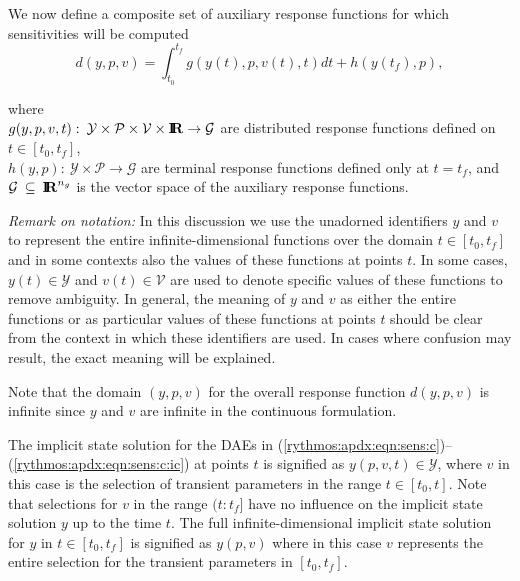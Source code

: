\documentclass[pdf,ps2pdf,11pt]{SANDreport}
\begin{document}
We now define a composite set of auxiliary response functions for which
sensitivities will be computed
%
\begin{equation}
d(y,p,v)
= \int_{t_0}^{t_f} g(y(t),p,v(t),t) dt + h(y(t_f),p),
\label{rythmos:eqn:sens:d}
\end{equation}
\begin{tabbing}
\hspace{4ex}where\hspace{1ex}\= \\
\>	$g(y,p,v,t) : \:
		\mathcal{Y} \times \mathcal{P} \times \mathcal{V} \times \mbox{\textbf{I}}\hspace{-0.6ex}\mbox{\textbf{R}}
		\rightarrow \mathcal{G}$ are distributed response functions defined on $t\in[t_0,t_f]$, \\
\>	$h(y,p) : \: \mathcal{Y} \times \mathcal{P}
		\rightarrow \mathcal{G}$ are terminal response functions defined only at $t=t_f$, and \\
\>	$\mathcal{G} \:\subseteq\:\mbox{\textbf{I}}\hspace{-0.6ex}\mbox{\textbf{R}}^{n_g}$ is the vector space of the auxiliary response functions.
\end{tabbing}

{}\textit{Remark on notation:} In this discussion we use the unadorned
identifiers $y$ and $v$ to represent the entire infinite-dimensional functions
over the domain $t\in[t_0,t_f]$ and in some contexts also the values of these
functions at points $t$.  In some cases, $y(t)\in\mathcal{Y}$ and
$v(t)\in\mathcal{V}$ are used to denote specific values of these functions to
remove ambiguity.  In general, the meaning of $y$ and $v$ as either the entire
functions or as particular values of these functions at points $t$ should be
clear from the context in which these identifiers are used.  In cases where
confusion may result, the exact meaning will be explained.

Note that the domain $(y,p,v)$ for the overall response function $d(y,p,v)$ is
infinite since $y$ and $v$ are infinite in the continuous formulation.


The implicit state solution for the DAEs in
(\ref{rythmos:apdx:eqn:sens:c})--(\ref{rythmos:apdx:eqn:sens:c:ic}) at points
$t$ is signified as $y(p,v,t)\in\mathcal{Y}$, where $v$ in this case is the
selection of transient parameters in the range $t\in[t_0,t]$.  Note that
selections for $v$ in the range $(t:t_f]$ have no influence on the implicit
state solution $y$ up to the time $t$.  The full infinite-dimensional implicit
state solution for $y$ in $t\in[t_0,t_f]$ is signified as $y(p,v)$ where in
this case $v$ represents the entire selection for the transient parameters in
$[t_0,t_f]$.
\end{document}
